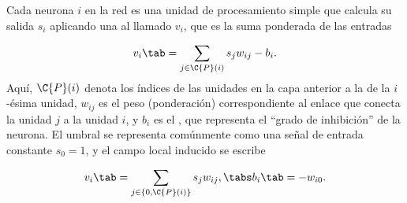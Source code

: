 Cada neurona $i$ en la red es una unidad de procesamiento simple que
calcula su salida $s_i$ aplicando una  al
llamado  $v_i$, que es la suma ponderada de
las entradas

\begin{align*}
  v_i \tab= \sum_{j\in\C{P}(i)} s_j w_{ij} - b_i .
\end{align*}
Aquí, $\C{P}(i)$ denota los índices de las unidades en la capa
anterior a la de la $i$-ésima unidad, $w_{ij}$ es el peso
(ponderación) correspondiente al enlace que conecta la unidad $j$ a la
unidad $i$, y $b_i$ es el , que representa el ``grado de
inhibición'' de la neurona. El umbral se representa comúnmente
como una señal de entrada constante $s_0=1$, y el campo local inducido
se escribe

\begin{align*}
  v_i \tab= \sum_{j\in\{0,\C{P}(i)\}} s_j w_{ij}, \tabs b_i\tab=-w_{i0}.
\end{align*}
